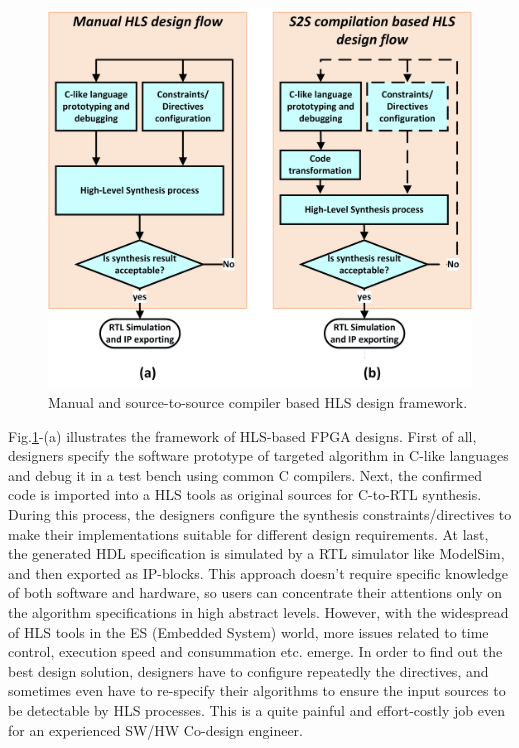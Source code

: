 \documentclass[10pt,twocolumn,letterpaper]{article}
\begin{document}
        \begin{figure}[t]
        \centering
        \includegraphics[width=\linewidth]{DesignFlow4HLS.png}
        \caption{Manual and source-to-source compiler based HLS design framework.}
        \label{DesignFlow4HLS}
        \end{figure}

Fig.\ref{DesignFlow4HLS}-(a) illustrates the framework of HLS-based FPGA designs. First of all, designers specify the software prototype of targeted algorithm in C-like languages and debug it in a test bench using common C compilers. Next, the confirmed code is imported into a HLS tools as original sources for C-to-RTL synthesis. During this process, the designers configure the synthesis constraints/directives to make their implementations suitable for different design requirements. At last, the generated HDL specification is simulated by a RTL simulator like ModelSim, and then exported as IP-blocks. This approach doesn't require specific knowledge of both software and hardware, so users can concentrate their attentions only on the algorithm specifications in high abstract levels. However, with the widespread of HLS tools in the ES (Embedded System) world, more issues related to time control, execution speed and consummation etc. emerge. In order to find out the best design solution, designers have to configure repeatedly the directives, and sometimes even have to re-specify their algorithms to ensure the input sources to be detectable by HLS processes. This is a quite painful and effort-costly job even for an experienced SW/HW Co-design engineer.
\end{document}
